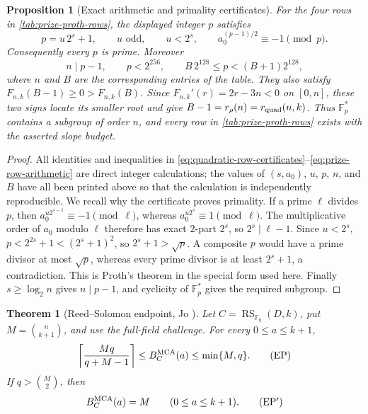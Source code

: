 \documentclass[11pt,a4paper]{amsart}
\numberwithin{equation}{section}
\newtheorem{theorem}{Theorem}[section]
\newtheorem{proposition}[proposition]{Proposition}
\theoremstyle{remark}
\DeclareMathOperator{\RS}{RS}
\newcommand{\F}{\mathbb F}
\newcommand{\ceil}[1]{\left\lceil #1\right\rceil}
\begin{document}
\begin{proposition}[Exact arithmetic and primality certificates]
\label{prop:proth-row-check}
For the four rows in \cref{tab:prize-proth-rows}, the displayed integer
\(p\) satisfies
\[
 p=u\,2^s+1,\qquad u\text{ odd},\qquad u<2^s,\qquad
 a_0^{(p-1)/2}\equiv-1\pmod p.                  \tag{PC1}
\label{eq:proth-certificates}
\]
Consequently every \(p\) is prime.  Moreover
\[
 n\mid p-1,\qquad p<2^{256},\qquad
 B\,2^{128}\le p<(B+1)2^{128},                  \tag{PC2}
\label{eq:prize-row-arithmetic}
\]
where \(n\) and \(B\) are the corresponding entries of the table.
They also satisfy \(F_{n,k}(B-1)\ge0>F_{n,k}(B)\).  Since
\(F_{n,k}'(r)=2r-3n<0\) on \([0,n]\), these two signs locate its smaller
root and give \(B-1=r_\rho(n)=r_{\rm quad}(n,k)\).
Thus \(\F_p^*\) contains a subgroup of order \(n\), and every row in
\cref{tab:prize-proth-rows} exists with the asserted slope budget.
\end{proposition}

\begin{proof}
All identities and inequalities in
\eqref{eq:quadratic-row-certificates}--\eqref{eq:prize-row-arithmetic}
are direct
integer calculations; the values of \((s,a_0)\), \(u\), \(p\), \(n\),
and \(B\) have all been printed above so that the calculation is
independently reproducible.  We recall why the certificate proves
primality.  If a prime \(\ell\) divides \(p\), then
\(a_0^{u2^{s-1}}\equiv-1\pmod\ell\), whereas
\(a_0^{u2^s}\equiv1\pmod\ell\).  The multiplicative order of \(a_0\)
modulo \(\ell\) therefore has exact \(2\)-part \(2^s\), so
\(2^s\mid\ell-1\).  Since \(u<2^s\),
\(p<2^{2s}+1<(2^s+1)^2\), so \(2^s+1>\sqrt p\).  A
composite \(p\) would have a prime divisor at most \(\sqrt p\), whereas
every prime divisor is at least \(2^s+1\), a contradiction.  This is Proth's theorem in the
special form used here.  Finally \(s\ge\log_2 n\) gives \(n\mid p-1\),
and cyclicity of \(\F_p^*\) gives the required subgroup.
\end{proof}

\begin{theorem}[Reed--Solomon endpoint, Jo
  {\cite[Thm.~4.3]{Jo26}}]\label{thm:jo-rs-endpoint}
Let \(C=\RS_{\F_q}(D,k)\), put \(M=\binom n{k+1}\), and use the
full-field challenge.  For every \(0\le a\le k+1\),
\[
 \ceil{\frac{Mq}{q+M-1}}
 \le B_C^{\rm MCA}(a)\le\min\{M,q\}.              \tag{EP}
\]
If \(q>\binom M2\), then
\[
                         B_C^{\rm MCA}(a)=M
                         \qquad(0\le a\le k+1).    \tag{EP$'$}
\]
\end{theorem}
\end{document}
